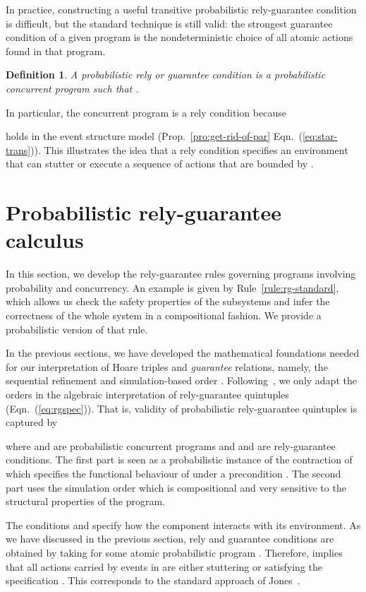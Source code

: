 \documentclass[review]{elsart}
\newtheorem{definition}{Definition}[section]
\newcommand{\Eqn}[1]{Eqn.~(\ref{#1})}
\newcommand{\Prop}[1]{Prop.~\ref{#1}}
\begin{document}
In practice, constructing a useful transitive probabilistic rely-guarantee condition is difficult, but the standard technique is still valid: the strongest guarantee condition of a given program is the nondeterministic choice of all atomic actions found in that program.
\begin{definition}\label{def:rely}
A \emph{probabilistic rely} or \emph{guarantee condition}  is a probabilistic concurrent program such that .
\end{definition} 

In particular, the concurrent program  is a rely condition because 

holds in the event structure model (\Prop{pro:get-rid-of-par} \Eqn{eq:star-trans}). This illustrates the idea that a rely condition specifies an environment that can stutter or execute a sequence of actions that are bounded by . 

\section{Probabilistic rely-guarantee calculus}\label{sec:prg-rules}

In this section, we develop the rely-guarantee rules governing programs involving probability and concurrency. An example is given by Rule~\ref{rule:rg-standard}, which allows us check the safety properties of the subsystems and infer the correctness of the whole system in a compositional fashion. We provide a probabilistic version of that rule.

In the previous sections, we have developed the mathematical foundations needed for our interpretation of Hoare triples and \emph{guarantee} relations, namely, the sequential refinement  and simulation-based order . Following~\cite{Hoa09a}, we only adapt the orders in the algebraic interpretation of rely-guarantee quintuples (\Eqn{eq:rgspec}). That is, validity of probabilistic rely-guarantee quintuples is captured by

where  and  are probabilistic concurrent programs and  and  are rely-guarantee conditions. The first part is seen as a probabilistic instance of the contraction of~\cite{Arm14} which specifies the functional behaviour of  under a precondition . The second part uses the simulation order which is compositional and  very sensitive to the structural properties of the program.

The conditions  and  specify how the component  interacts with its environment. As we have discussed in the previous section, rely and guarantee conditions are obtained by taking  for some atomic probabilistic program . Therefore,  implies that all actions carried by events in  are either stuttering or satisfying the specification . This corresponds to the standard approach of Jones~\cite{Jon12,Jon81}.
\end{document}
